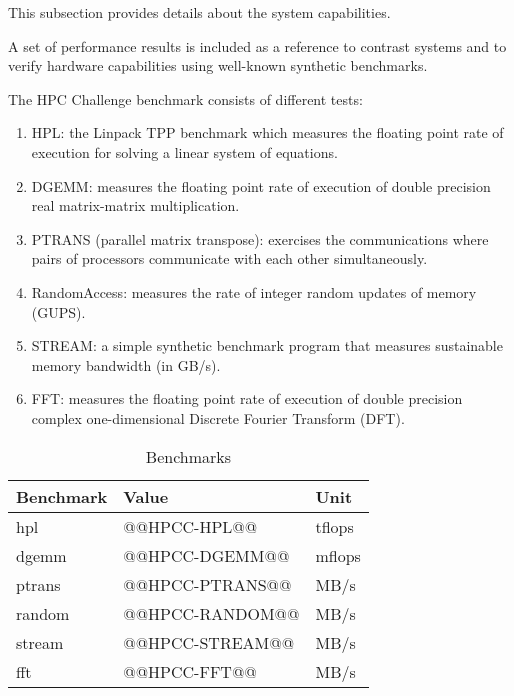 \documentclass[a4paper]{article}
\begin{document}
This subsection provides details about the system capabilities.

\smallskip

A set of performance results is included as a reference to contrast systems and to verify hardware capabilities using well-known synthetic benchmarks.

\smallskip

The HPC Challenge benchmark consists of different tests:

\begin{enumerate}
\item{HPL}: the Linpack TPP benchmark which measures the floating point rate of execution for solving a linear system of equations.
\item{DGEMM}: measures the floating point rate of execution of double precision real matrix-matrix multiplication.
\item{PTRANS (parallel matrix transpose)}: exercises the communications where pairs of processors communicate with each other simultaneously.
\item{RandomAccess}: measures the rate of integer random updates of memory (GUPS).
\item{STREAM}: a simple synthetic benchmark program that measures sustainable memory bandwidth (in GB/s).
\item{FFT}: measures the floating point rate of execution of double precision complex one-dimensional Discrete Fourier Transform (DFT).
\end{enumerate}

\begin{table}[H]
\caption{Benchmarks}
  \centering
    \begin{tabular}{|l|l|l|}\hline
      {\bf Benchmark} & {\bf Value} & {\bf Unit} \\ \hline
      hpl & @@HPCC-HPL@@ & tflops \\ \hline
      dgemm & @@HPCC-DGEMM@@ & mflops \\ \hline
      ptrans & @@HPCC-PTRANS@@ & MB/s \\ \hline
      random & @@HPCC-RANDOM@@ & MB/s \\ \hline
      stream & @@HPCC-STREAM@@ & MB/s \\ \hline
      fft & @@HPCC-FFT@@ & MB/s \\ \hline
    \end{tabular}
 \label{table:pruebas}
\end{table}

\smallskip
\end{document}

